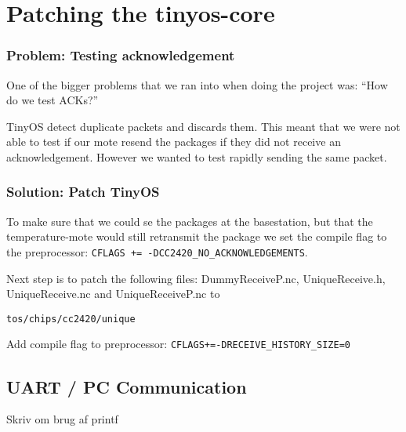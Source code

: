 \section{Patching the tinyos-core}

\subsubsection{Problem: Testing acknowledgement}
One of the bigger problems that we ran into when doing the project was: ``How
do we test ACKs?''

TinyOS detect duplicate packets and discards them. This meant that we were not
able to test if our mote resend the packages if they did not receive an
acknowledgement. However we wanted to test rapidly sending the
same packet. 

\subsubsection{Solution: Patch TinyOS}

To make sure that we could se the packages at the basestation, but that the
temperature-mote would still retransmit the package we set the compile flag to
the preprocessor: \texttt{CFLAGS += -DCC2420\_NO\_ACKNOWLEDGEMENTS}.

Next step is to patch the following files: 
DummyReceiveP.nc, UniqueReceive.h, UniqueReceive.nc and UniqueReceiveP.nc to 

\texttt{tos/chips/cc2420/unique}

Add compile flag to preprocessor: \texttt{CFLAGS+=-DRECEIVE\_HISTORY\_SIZE=0}


\subsection{UART / PC Communication}
Skriv om brug af printf
	
